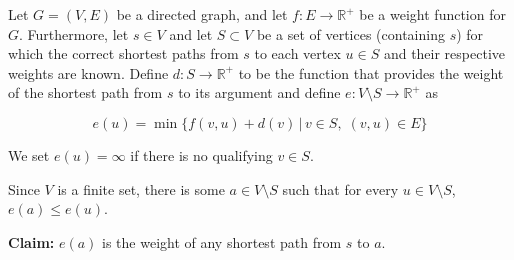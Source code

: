 \documentclass[12pt,twoside]{reedthesis}
\begin{document}
\setlength{\parindent}{0cm}
Let $G = (V,E)$ be a directed graph, and let $f : E \rightarrow \mathbb{R^+}$ be a weight function for $G$. Furthermore, let $s \in V$ and let $S \subset V$ be a set of vertices (containing $s$) for which the correct shortest paths from $s$ to each vertex $u \in S$ and their respective weights are known. Define $d : S \rightarrow \mathbb{R^+}$ to be the function that provides the weight of the shortest path from $s$ to its argument and define $e : V \setminus S \rightarrow \mathbb{R^+}$ as

$$
e(u) = \min \{ f(v,u) + d(v) \, | \, v \in S, \; (v,u) \in E \}
$$

We set $e(u) = \infty$ if there is no qualifying $v \in S$.



Since $V$ is a finite set, there is some $a \in V \setminus S$ such that for every $u \in V \setminus S$, $e(a) \leq e(u)$.
\vspace{1pc}

\textbf{Claim:} $e(a)$ is the weight of any shortest path from $s$ to $a$.
\end{document}
